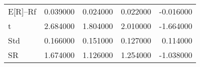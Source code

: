 \begin{tabular}{lrrrr}
\toprule
\midrule
E[R]--Rf & 0.039000 & 0.024000 & 0.022000 & -0.016000 \\
t & 2.684000 & 1.804000 & 2.010000 & -1.664000 \\
Std & 0.166000 & 0.151000 & 0.127000 & 0.114000 \\
SR & 1.674000 & 1.126000 & 1.254000 & -1.038000 \\
\bottomrule
\end{tabular}
